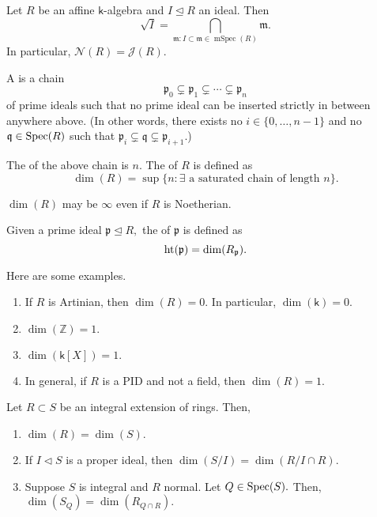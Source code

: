 \documentclass[12pt]{article}	%
\DeclareMathOperator{\mSpec}{mSpec}
\begin{document}
\begin{cor}
	Let $R$ be an affine $\mathsf{k}$-algebra and $I \unlhd R$ an ideal. Then
	\begin{equation*} 
		\sqrt{I} = \bigcap_{\mathfrak{m} : I \subset \mathfrak{m} \in \mSpec(R)} \mathfrak{m}.
	\end{equation*}
	In particular, $\mathcal{N}(R) = \mathcal{J}(R).$
\end{cor}

\begin{defn}%
	\label{defn:krulldimring}
	A  is a chain
	\begin{equation*} 
		\mathfrak{p}_0 \subsetneq \mathfrak{p}_1 \subsetneq \cdots \subsetneq \mathfrak{p}_n
	\end{equation*}
	of prime ideals such that no prime ideal can be inserted strictly in between anywhere above. (In other words, there exists no $i \in \{0, \ldots, n - 1\}$ and no $\mathfrak{q} \in \operatorname{Spec}(R)$ such that $\mathfrak{p}_i \subsetneq \mathfrak{q} \subsetneq \mathfrak{p}_{i + 1}.$)

	The  of the above chain is $n.$ The  of $R$ is defined as
	\begin{equation*} 
		\dim(R) = \sup\{n : \exists \text{ a saturated chain of length }n\}.
	\end{equation*}
\end{defn}
$\dim(R)$ may be $\infty$ even if $R$ is Noetherian. 
\begin{defn}%
	Given a prime ideal $\mathfrak{p} \unlhd R,$ the  of $\mathfrak{p}$ is defined as 
	\begin{equation*} 
		\operatorname{ht}(\mathfrak{p}) = \dim(R_\mathfrak{p}).
	\end{equation*}
\end{defn}

\begin{ex}
	Here are some examples.
	\begin{enumerate}
		\item If $R$ is Artinian, then $\dim(R) = 0.$ In particular, $\dim(\mathsf{k}) = 0.$
		\item $\dim(\mathbb{Z}) = 1.$
		\item $\dim(\mathsf{k}[X]) = 1.$
		\item In general, if $R$ is a PID and not a field, then $\dim(R) = 1.$
	\end{enumerate}
\end{ex}

\begin{prop}
	Let $R \subset S$ be an integral extension of rings. Then,
	\begin{enumerate}
		\item $\dim(R) = \dim(S).$
		\item If $I \lhd S$ is a proper ideal, then $\dim(S/I) = \dim(R/I \cap R).$
		\item Suppose $S$ is integral and $R$ normal. Let $Q \in \operatorname{Spec}(S).$ Then, $\dim(S_Q) = \dim(R_{Q \cap R}).$
	\end{enumerate}
\end{prop}
\end{document}
